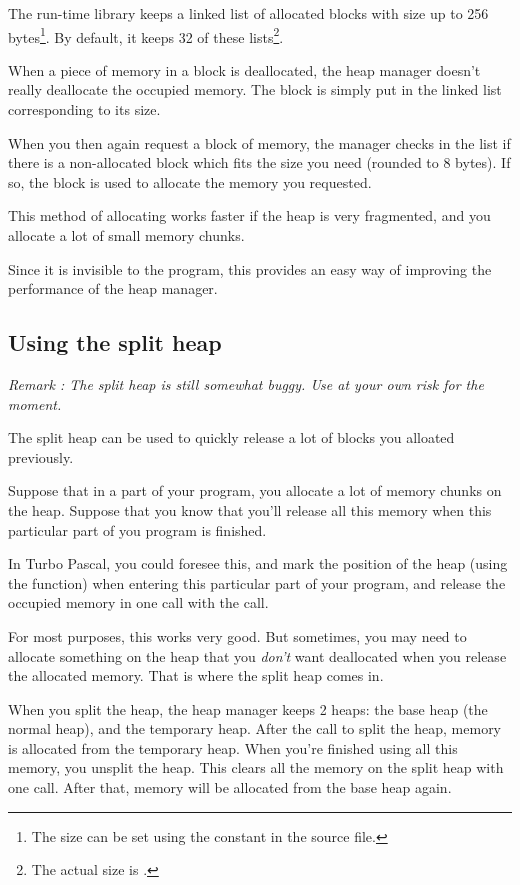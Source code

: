 \documentclass{report}
\begin{document}
The run-time library keeps a linked list of allocated blocks with size
up to 256 bytes\footnote{The size can be set using the 
constant in the  source file.}. By default, it keeps 32 of
these lists\footnote{The actual size is .}.

When a piece of memory in a block is deallocated, the heap manager doesn't
really deallocate the occupied memory. The block is simply put in the linked
list corresponding to its size.

When you then again request a block of memory, the manager checks in the
list if there is a non-allocated block which fits the size you need (rounded
to 8 bytes). If so, the block is used to allocate the memory you requested.

This method of allocating works faster if the heap is very fragmented, and
you allocate a lot of small memory chunks.

Since it is invisible to the program, this provides an easy way of improving
the performance of the heap manager.

\subsection{Using the split heap}
{\em Remark : The split heap is still somewhat buggy. Use at your own risk
for the moment.}

The split heap can be used to quickly release a lot of blocks you alloated
previously.

Suppose that in a part of your program, you allocate a lot of memory chunks
on the heap. Suppose that you know that you'll release all this memory when
this particular part of you program is finished.

In Turbo Pascal, you could foresee this, and mark the position of the heap
(using the  function) when entering this particular part of your
program, and release the occupied memory in one call with the 
call.

For most purposes, this works very good. But sometimes, you may need to
allocate something on the heap that you {\em don't} want deallocated when you
release the allocated memory. That is where the split heap comes in.

When you split the heap, the heap manager keeps 2 heaps: the base heap (the
normal heap), and the temporary heap. After the call to split the heap,
memory is allocated from the temporary heap. When you're finished using all
this memory, you unsplit the heap. This clears all the memory on the split
heap with one call. After that, memory will be allocated from the base heap
again.
\end{document}
